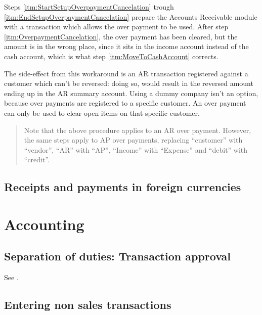 Steps \ref{itm:StartSetupOverpaymentCancelation} trough \ref{itm:EndSetupOverpaymentCancelation}
prepare the Accounts Receivable module with a transaction which allows the over payment to be used.
After step \ref{itm:OverpaymentCancelation}, the over payment has been cleared, but the
amount is in the wrong place, since it sits in the income account instead of the cash account,
which is what step \ref{itm:MoveToCashAccount} corrects.

The side-effect from this workaround is an AR transaction registered against a \gls{customer} which can't
be reversed: doing so, would result in the reversed amount ending up in the AR summary account.  Using
a dummy company isn't an option, because over payments are registered to a specific \gls{customer}.  An
over payment can only be used to clear open items on that specific \gls{customer}.

\begin{quotation}
Note that the above procedure applies to an AR over payment. However, the same steps apply to
AP over payments, replacing ``customer'' with ``vendor'', ``AR'' with ``AP'', ``Income'' with
``Expense'' and ``debit'' with ``credit''.
\end{quotation}

\section{Receipts and payments in foreign currencies}
\label{sec-business-processes-payment-processing-fx-payments}

\chapter{Accounting}
\label{cha-business-processes-accounting}

\section{Separation of duties: Transaction approval}
\label{sec-business-processes-accounting-transaction-approval}

See .

\section{Entering non sales transactions}
\label{sec-business-processes-accounting-transaction-entry}

